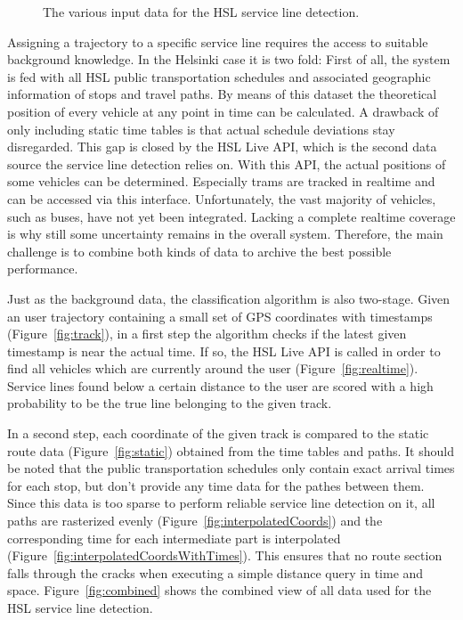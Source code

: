 \begin{figure}[ht]
{  \label{fig:interpolatedCoordsWithTimes}
  \setcounter{subfigure}{5}
} 
\caption{
The various input data for the HSL service line detection.
}
\label{fig:SLD}
\end{figure}

Assigning a trajectory to a specific service line requires the access to suitable background knowledge. In the Helsinki case it is two fold:
First of all, the system is fed with all HSL public transportation schedules and associated geographic information of stops and travel paths. By means of this dataset the theoretical position of every vehicle at any point in time can be calculated. A drawback of only including static time tables is that actual schedule deviations stay disregarded. This gap is closed by the HSL Live API, which is the second data source the service line detection relies on. With this API, the actual positions of some vehicles can be determined. Especially trams are tracked in realtime and can be accessed via this interface.  Unfortunately, the vast majority of vehicles, such as buses, have not yet been integrated. Lacking a complete realtime coverage is why still some uncertainty remains in the overall system. Therefore, the main challenge is to combine both kinds of data to archive the best possible performance.

Just as the background data, the classification algorithm is also two-stage. Given an user trajectory containing a small set of GPS coordinates with timestamps (Figure~\ref{fig:track}), in a first step the algorithm checks if the latest given timestamp is near the actual time. If so, the HSL Live API is called in order to find all vehicles which are currently around the user (Figure~\ref{fig:realtime}). Service lines found below a certain distance to the user are scored with a high probability to be the true line belonging to the given track.

In a second step, each coordinate of the given track is compared to the static route data (Figure~\ref{fig:static}) obtained from the time tables and paths.
It should be noted that the public transportation schedules only contain exact arrival times for each stop, but don't provide any time data for the pathes between them. Since this data is too sparse to perform reliable service line detection on it, all paths are rasterized evenly (Figure~\ref{fig:interpolatedCoords}) and the corresponding time for each intermediate part is interpolated (Figure~\ref{fig:interpolatedCoordsWithTimes}). This ensures that no route section falls through the cracks when executing a simple distance query in time and space. Figure~\ref{fig:combined} shows the combined view of all data used for the HSL service line detection.

